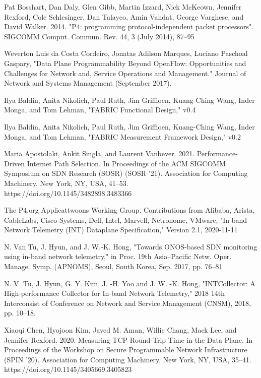 \documentclass[conference]{IEEEtran}
\begin{document}
    \begin{thebibliography}{00}
         Pat Bosshart, Dan Daly, Glen Gibb, Martin Izzard, Nick McKeown, Jennifer Rexford, Cole Schlesinger, Dan Talayco, Amin Vahdat, George Varghese, and David Walker. 2014. "P4: programming protocol-independent packet processors". SIGCOMM Comput. Commun. Rev. 44, 3 (July 2014), 87–95

         Weverton Luis da Costa Cordeiro, Jonatas Adilson Marques, Luciano Paschoal Gaspary, "Data Plane Programmability Beyond OpenFlow: Opportunities and Challenges for Network and, Service Operations and Management." Journal of Network and Systems Management (September 2017).

         Ilya Baldin, Anita Nikolich, Paul Ruth, Jim Griffioen, Kuang-Ching Wang, Inder Monga, and Tom Lehman, "FABRIC Functional Design," v0.4

         Ilya Baldin, Anita Nikolich, Paul Ruth, Jim Griffioen, Kuang-Ching Wang, Inder Monga, and Tom Lehman, "FABRIC Measurement Framework Design," v0.2

         Maria Apostolaki, Ankit Singla, and Laurent Vanbever. 2021. Performance-Driven Internet Path Selection. In Proceedings of the ACM SIGCOMM Symposium on SDN Research (SOSR) (SOSR '21). Association for Computing Machinery, New York, NY, USA, 41–53. https://doi.org/10.1145/3482898.3483366

         The P4.org Applicattwoons Working Group. Contributions from Alibaba, Arista, CableLabs, Cisco Systems, Dell, Intel, Marvell, Netronome, VMware, "In-band Network Telemetry (INT) Dataplane Specification," Version 2.1, 2020-11-11

         N. Van Tu, J. Hyun, and J. W.-K. Hong, "Towards ONOS-based SDN monitoring using in-band network telemetry," in Proc. 19th Asia–Pacific Netw. Oper. Manage. Symp. (APNOMS), Seoul, South Korea, Sep. 2017, pp. 76–81

         N. V. Tu, J. Hyun, G. Y. Kim, J. -H. Yoo and J. W. -K. Hong, "INTCollector: A High-performance Collector for In-band Network Telemetry," 2018 14th Interconsist of Conference on Network and Service Management (CNSM), 2018, pp. 10–18.

         Xiaoqi Chen, Hyojoon Kim, Javed M. Aman, Willie Chang, Mack Lee, and Jennifer Rexford. 2020. Measuring TCP Round-Trip Time in the Data Plane. In Proceedings of the Workshop on Secure Programmable Network Infrastructure (SPIN '20). Association for Computing Machinery, New York, NY, USA, 35–41. https://doi.org/10.1145/3405669.3405823
    \end{thebibliography}
    
\end{document}
